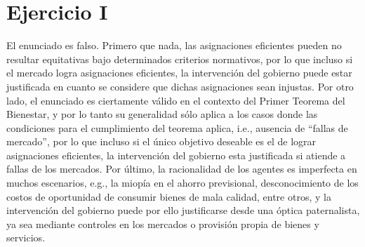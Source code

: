 \documentclass[12pt,a4paper,notitlepage]{article}
\begin{document}


\thispagestyle{empty} 


\section*{Ejercicio I}
\noindent El enunciado es falso. Primero que nada, las asignaciones eficientes pueden no resultar equitativas bajo determinados criterios normativos, por lo que incluso si el mercado logra asignaciones eficientes, la intervención del gobierno puede estar justificada en cuanto se considere que dichas asignaciones sean injustas. Por otro lado, el enunciado es ciertamente válido en el contexto del Primer Teorema del Bienestar, y por lo tanto su generalidad sólo aplica a los casos donde las condiciones para el cumplimiento del teorema aplica, i.e., ausencia de ``fallas de mercado'', por lo que incluso si el único objetivo deseable es el de lograr asignaciones eficientes, la intervención del gobierno esta justificada si atiende a fallas de los mercados. Por último, la racionalidad de los agentes es imperfecta en muchos escenarios, e.g., la miopía en el ahorro previsional, desconocimiento de los costos de oportunidad de consumir bienes de mala calidad, entre otros, y la intervención del gobierno puede por ello justificarse desde una óptica paternalista, ya sea mediante controles en los mercados o provisión propia de bienes y servicios.\\
\end{document}
